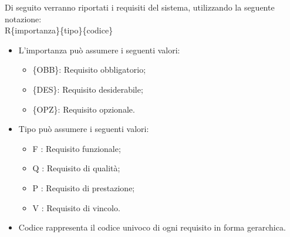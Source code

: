 Di seguito verranno riportati i requisiti del sistema, utilizzando la seguente notazione:\\
R\{importanza\}\{tipo\}\{codice\}

\begin{itemize}
	\item L'importanza può assumere i seguenti valori:
	\begin{itemize}
		\item \{OBB\}: Requisito obbligatorio;
		\item \{DES\}: Requisito desiderabile;
		\item \{OPZ\}: Requisito opzionale.
	\end{itemize}
	
	\item Tipo può assumere i seguenti valori:
	\begin{itemize}
		\item {F} : Requisito funzionale;
		\item {Q} : Requisito di qualità;
		\item {P} : Requisito di prestazione;
		\item {V} : Requisito di vincolo.
	\end{itemize}
	
	\item Codice rappresenta il codice univoco di ogni requisito in forma gerarchica.
\end{itemize}
\newpage


\newpage


\newpage


\newpage


\newpage


\newpage